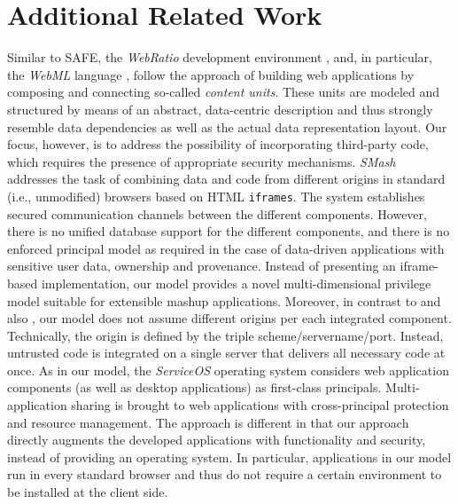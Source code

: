 \documentclass{src/acm_proc_article-sp} \else
\newcommand\SAFE{SAFE\xspace}
\begin{document}
   \section{Additional Related Work}
\label{sec:related}

Similar to \SAFE, the \textit{WebRatio} development environment
\cite{Acerbis2004:WebRatio,Brambilla2007:WebML-WebRatio}, and, in particular,
the \textit{WebML} language \cite{WebML2000a}, follow the approach of building web
applications by composing and connecting so-called \emph{content units}. These
units are modeled and structured by means of an abstract, data-centric
description and thus strongly resemble data dependencies as well as the actual
data representation layout. Our focus, however, is to address the possibility
of incorporating third-party code, which requires the presence of appropriate
security mechanisms.
\textit{SMash}~\cite{DeKeukelaere2008:SMash} addresses the task of
combining data and code from different origins in standard
(i.e., unmodified) browsers based on HTML \texttt{iframes}.
The system establishes secured communication channels
between the different components. However, there is no
unified database support for the different components, and
there is no enforced principal model as required in the case
of data-driven applications with sensitive user data,
ownership and provenance. Instead of presenting an
iframe-based implementation, our model provides a novel
multi-dimensional privilege model suitable for extensible
mashup applications.
Moreover, in contrast to \cite{DeKeukelaere2008:SMash} and
also
\cite{Magazinius2010:LatticeBasedApproach,BJM09:frames}, our
model does not assume different origins per each integrated
component. Technically, the origin is defined by the triple
scheme/servername/port. Instead, untrusted code is
integrated on a single server that delivers all necessary
code at once.
As in our model, the \textit{ServiceOS} operating system
\cite{Wang2009:Convergence} considers web application
components (as well as desktop applications) as first-class
principals. Multi-application sharing is brought to web
applications with cross-principal protection and resource
management. The approach is different in that our approach
directly augments the developed applications with
functionality and security, instead of providing an
operating system. In particular, applications in our model run in
every standard browser and thus do not require a certain
environment to be installed at the client side.
\end{document}
